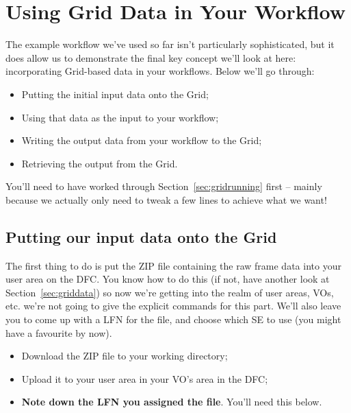 \section{Using Grid Data in Your Workflow}
\label{sec:griddatarunning}
The example workflow we've used so far isn't particularly sophisticated,
but it does allow us to demonstrate the final key concept we'll look at
here: incorporating Grid-based data in your workflows. Below we'll go
through:

\begin{itemize}
\tightlist
\item
  Putting the initial input data onto the Grid;
\item
  Using that data as the input to your workflow;
\item
  Writing the output data from your workflow to the Grid;
\item
  Retrieving the output from the Grid.
\end{itemize}

You'll need to have worked through Section~\ref{sec:gridrunning}
first -- mainly because we actually only need to tweak a few lines to
achieve what we want!

\subsection{Putting our input data onto the Grid}
\label{putting-our-input-data-onto-the-grid}
The first thing to do is put the ZIP file containing the raw frame data
into your user area on the DFC. You know how to do this (if not, have
another look at Section~\ref{sec:griddata})
so now we're getting into the realm of user areas, VOs, etc.
we're not going to give the explicit commands for this part. We'll also
leave you to come up with a LFN for the file, and choose which SE to use
(you might have a favourite by now).

\begin{itemize}
\tightlist
\item
  Download the ZIP file to your working directory;
\item
  Upload it to your user area in your VO's area in the DFC;
\item
  \textbf{Note down the LFN you assigned the file}. You'll need this
  below.
\end{itemize}

